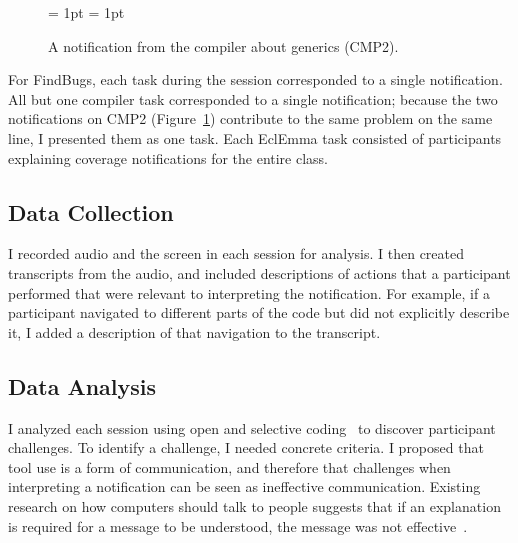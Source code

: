 \begin{figure} 
\subfigcapskip = 1pt
\centering
{}
\subfigcapskip = 1pt

\caption{A notification from the compiler about generics (CMP2).}
\label{fig:CMP2} 
\end{figure}

For FindBugs, each task during the session corresponded to a single
notification.
All but one compiler task corresponded to a single notification;
because the two notifications on CMP2 (Figure~\ref{fig:CMP2}) contribute to the same problem on the same line, I presented them as one task. 
Each EclEmma task consisted of participants explaining coverage notifications for the entire class. 

\subsection{Data Collection}

I recorded audio and the screen in each session for analysis.
I then created transcripts from the audio, 
and included descriptions of actions that a participant performed 
that were relevant to interpreting the notification. 
For example, if a participant navigated to different parts of the code 
but did not explicitly describe it, 
I added a description of that navigation to the transcript.

\subsection{Data Analysis}

I analyzed each session using open and selective coding~\cite{corbin2014basics} to discover participant challenges. 
To identify a challenge, I needed concrete criteria. 
I proposed that tool use is a form of communication, and therefore that challenges when interpreting a notification can be seen as ineffective communication.
Existing research on how computers should talk to people suggests that if an explanation is required for a message to be understood, the message was not effective~\cite{dean1982computer}.

